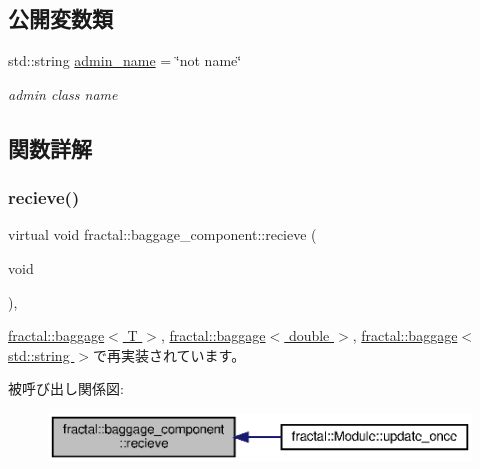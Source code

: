 \subsection*{公開変数類}
\begin{DoxyCompactItemize}
\item 
std\+::string \hyperlink{classfractal_1_1baggage__component_a629dba0fbfbce31e2caeb075440ee2dc}{admin\+\_\+name} = \char`\"{}not name\char`\"{}
\begin{DoxyCompactList}\small\item\em admin class name \end{DoxyCompactList}\end{DoxyCompactItemize}


\subsection{関数詳解}
\mbox{\label{classfractal_1_1baggage__component_a37ef357c567ca8844d1b83c83e86df74}} 
\subsubsection{\texorpdfstring{recieve()}{recieve()}}
{\footnotesize\ttfamily virtual void fractal\+::baggage\+\_\+component\+::recieve (\begin{DoxyParamCaption}\item[{void}]{ }\end{DoxyParamCaption})\hspace{0.3cm}{\ttfamily [inline]}, {\ttfamily [virtual]}}



\hyperlink{classfractal_1_1baggage_aa7d07fc98f7c76789e6047345b2119ce}{fractal\+::baggage$<$ T $>$}, \hyperlink{classfractal_1_1baggage_aa7d07fc98f7c76789e6047345b2119ce}{fractal\+::baggage$<$ double $>$}, \hyperlink{classfractal_1_1baggage_aa7d07fc98f7c76789e6047345b2119ce}{fractal\+::baggage$<$ std\+::string $>$}で再実装されています。

被呼び出し関係図\+:
\nopagebreak
\begin{figure}[H]
\begin{center}
\leavevmode
\includegraphics[width=350pt]{classfractal_1_1baggage__component_a37ef357c567ca8844d1b83c83e86df74_icgraph}
\end{center}
\end{figure}
\mbox{\label{classfractal_1_1baggage__component_a8fdf9e534f892911e674de5a60eadf64}} 
